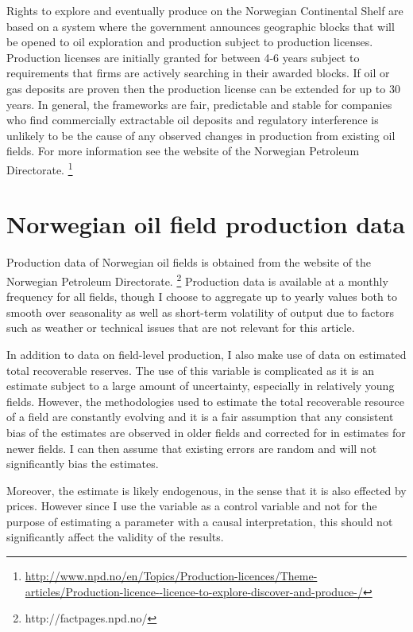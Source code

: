\documentclass[11pt]{article}
\begin{document}
Rights to explore and eventually produce on the Norwegian Continental Shelf are based on a system where the government announces geographic blocks that will be opened to oil exploration and production subject to production licenses.  Production licenses are initially granted for between 4-6 years subject to requirements that firms are actively searching in their awarded blocks.  If oil or gas deposits are proven then the production license can be extended for up to 30 years.  In general, the frameworks are fair, predictable and stable for companies who find commercially extractable oil deposits and regulatory interference is unlikely to be the cause of any observed changes in production from existing oil fields.  For more information see the website of the Norwegian Petroleum Directorate. \footnote{\url{http://www.npd.no/en/Topics/Production-licences/Theme-articles/Production-licence--licence-to-explore-discover-and-produce-/}}

\section{Norwegian oil field production data}
Production data of Norwegian oil fields is obtained from the website of the Norwegian Petroleum Directorate. \footnote{http://factpages.npd.no/}  Production data is available at a monthly frequency for all fields, though I choose to aggregate up to yearly values both to smooth over seasonality as well as short-term volatility of output due to factors such as weather or technical issues that are not relevant for this article.  

In addition to data on field-level production, I also make use of data on estimated total recoverable reserves. The use of this variable is complicated as it is an estimate subject to a large amount of uncertainty, especially in relatively young fields.  However, the methodologies used to estimate the total recoverable resource of a field are constantly evolving and it is a fair assumption that any consistent bias of the estimates are observed in older fields and corrected for in estimates for newer fields.  I can then assume that existing errors are random and will not significantly bias the estimates.  

Moreover, the estimate is likely endogenous, in the sense that it is also effected by prices.  However since I use the variable as a control variable and not for the purpose of estimating a parameter with a causal interpretation, this should not significantly affect the validity of the results.  
\end{document}

